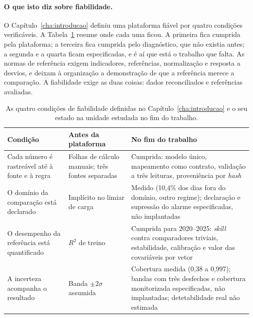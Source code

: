 \paragraph{O que isto diz sobre fiabilidade.} O Capítulo~\ref{cha:introducao}
definiu uma plataforma fiável por quatro condições verificáveis. A
Tabela~\ref{tab:fiabilidade-estado} resume onde cada uma ficou. A primeira
fica cumprida pela plataforma; a terceira fica cumprida pelo diagnóstico, que
não existia antes; a segunda e a quarta ficam especificadas, e é aí que está
o trabalho que falta. As normas de referência exigem indicadores,
referências, normalização e resposta a desvios, e deixam à organização a
demonstração de que a referência merece a comparação. A fiabilidade exige as
duas coisas: dados reconciliados e referências avaliadas.

\begin{table}[htbp]
  \centering\small
  \caption[Condições de fiabilidade: estado no fim do trabalho]{As quatro
  condições de fiabilidade definidas no Capítulo~\ref{cha:introducao} e o seu
  estado na unidade estudada no fim do trabalho.}
  \label{tab:fiabilidade-estado}
  \begin{tabularx}{\textwidth}{@{}>{\raggedright\arraybackslash}p{3.3cm}>{\raggedright\arraybackslash}X>{\raggedright\arraybackslash}X@{}}
    \toprule
    Condição & Antes da plataforma & No fim do trabalho \\
    \midrule
    Cada número é rastreável até à fonte e à regra & Folhas de cálculo manuais; três fontes separadas & Cumprida: modelo único, mapeamento como contrato, validação a três leituras, proveniência por \emph{hash} \\
    \addlinespace
    O domínio da comparação está declarado & Implícito no limiar de carga & Medido (10,4\% dos dias fora do domínio, outro regime); declaração e supressão do alarme especificadas, não implantadas \\
    \addlinespace
    O desempenho da referência está quantificado & $R^2$ de treino & Cumprida para 2020--2025: \emph{skill} contra comparadores triviais, estabilidade, calibração e valor das covariáveis por vetor \\
    \addlinespace
    A incerteza acompanha o resultado & Banda $\pm2\sigma$ assumida & Cobertura medida (0,38 a 0,997); bandas com três desfechos e cobertura monitorizada especificadas, não implantadas; detetabilidade real não estimada \\
    \bottomrule
  \end{tabularx}
\end{table}

